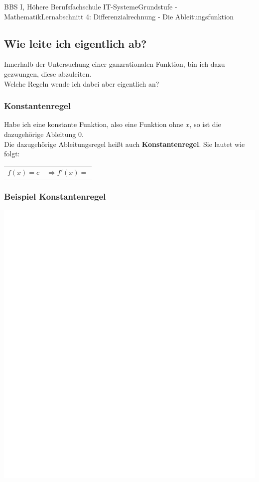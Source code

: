 \documentclass[11pt,twocolumn,oneside,openany,headings=optiontotoc,11pt,numbers=noenddot]{article}
\begin{document}
	\begin{worksheet}{BBS I, Höhere Berufsfachschule IT-Systeme}{Grundstufe - Mathematik}{Lernabschnitt 4: Differenzialrechnung - Die Ableitungsfunktion}
		\setcounter{section}{7}
		\setcounter{subsection}{2}
		\subsection{Wie leite ich eigentlich ab?}
		Innerhalb der Untersuchung einer ganzrationalen Funktion, bin ich dazu gezwungen, diese abzuleiten.\\
		Welche Regeln wende ich dabei aber eigentlich an?
		\subsubsection{Konstantenregel}
		Habe ich eine konstante Funktion, also eine Funktion ohne \(x\), so ist die dazugehörige Ableitung \(0\).\\
		Die dazugehörige Ableitungsregel heißt auch \textbf{Konstantenregel}. Sie lautet wie folgt:
		\begin{framed}
			\noindent
			\begin{tabularx}{0.7\textwidth}{XX}
				\(f(x) = c\) & \(\Rightarrow f'(x) = \)\\
			\end{tabularx}
		\end{framed}
		\subsubsection*{Beispiel Konstantenregel}
		\includegraphics[scale=0.2]{../../empty.jpg}\\

\end{worksheet}
\end{document}
